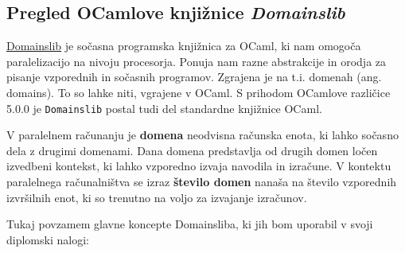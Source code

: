 \documentclass[mat1, tisk]{fmfdelo}
\begin{document}
\subsection{Pregled OCamlove knjižnice \textit{Domainslib}} \label{sec:pregled_domainslib}

\href{https://github.com/ocaml-multicore/domainslib}{Domainslib} je sočasna programska knjižnica za OCaml, 
ki nam omogoča paralelizacijo na nivoju procesorja. Ponuja nam razne abstrakcije in orodja za pisanje vzporednih
in sočasnih programov. Zgrajena je na t.i. domenah (ang. domains). To so lahke niti, vgrajene v OCaml.
S prihodom OCamlove različice 5.0.0 je \texttt{Domainslib} postal tudi del standardne knjižnice OCaml.

\begin{definicija}
  V paralelnem računanju je \textbf{domena} neodvisna računska enota, ki lahko sočasno dela z drugimi domenami.
  Dana domena predstavlja od drugih domen ločen izvedbeni kontekst, ki lahko vzporedno izvaja navodila in izračune.
  V kontektu paralelnega računalništva se izraz \textbf{število domen} nanaša na število vzporednih izvršilnih enot,
  ki so trenutno na voljo za izvajanje izračunov.
\end{definicija}

Tukaj povzamem glavne koncepte Domainsliba, ki jih bom uporabil v svoji diplomski nalogi:
\end{document}
